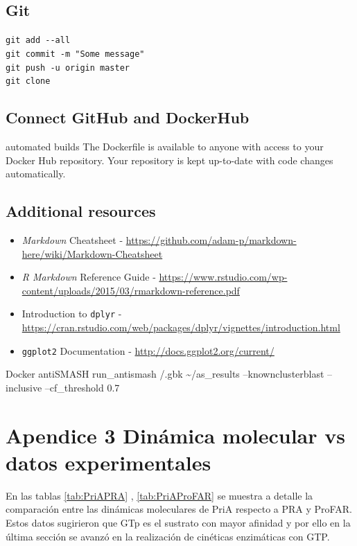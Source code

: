 \documentclass[12pt,twoside]{reedthesis}
\begin{document}
  \section{Git}\label{git}
  
  \texttt{git\ add\ -\/-all}\\
  \texttt{git\ commit\ -m\ "Some\ message"}\\
  \texttt{git\ push\ -u\ origin\ master}\\
  \texttt{git\ clone}
  
  \section{Connect GitHub and
  DockerHub}\label{connect-github-and-dockerhub}
  
  automated builds The Dockerfile is available to anyone with access to
  your Docker Hub repository. Your repository is kept up-to-date with code
  changes automatically.
  
  \section{Additional resources}\label{additional-resources}
  
  \begin{itemize}
  \item
    \emph{Markdown} Cheatsheet -
    \url{https://github.com/adam-p/markdown-here/wiki/Markdown-Cheatsheet}
  \item
    \emph{R Markdown} Reference Guide -
    \url{https://www.rstudio.com/wp-content/uploads/2015/03/rmarkdown-reference.pdf}
  \item
    Introduction to \texttt{dplyr} -
    \url{https://cran.rstudio.com/web/packages/dplyr/vignettes/introduction.html}
  \item
    \texttt{ggplot2} Documentation -
    \url{http://docs.ggplot2.org/current/}
  \end{itemize}
  
  Docker antiSMASH run\_antismash /.gbk \textasciitilde{}/as\_results
  --knownclusterblast --inclusive --cf\_threshold 0.7
  
  \chapter{Apendice 3 Dinámica molecular vs datos
  experimentales}\label{apendice-3-dinamica-molecular-vs-datos-experimentales}
  
  En las tablas \autoref{tab:PriAPRA} , \autoref{tab:PriAProFAR} se
  muestra a detalle la comparación entre las dinámicas moleculares de PriA
  respecto a PRA y ProFAR. Estos datos sugirieron que GTp es el sustrato
  con mayor afinidad y por ello en la última sección se avanzó en la
  realización de cinéticas enzimáticas con GTP.
  
\end{document}
